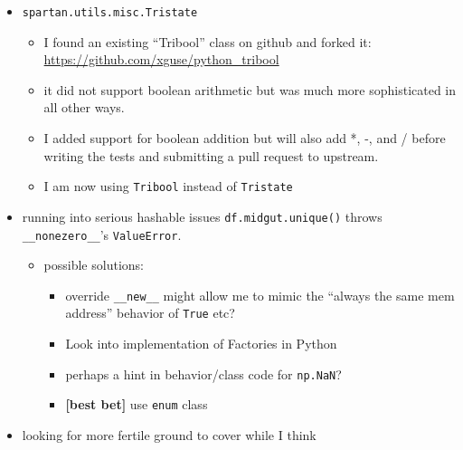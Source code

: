 \documentclass[letterpaper]{scrartcl}
\begin{document}
\begin{itemize}
\itemsep1pt\parskip0pt
\item
  \texttt{spartan.utils.misc.Tristate}

  \begin{itemize}
  \itemsep1pt\parskip0pt
  \item
    I found an existing ``Tribool'' class on github and forked
    it:\\\url{https://github.com/xguse/python_tribool}
  \item
    it did not support boolean arithmetic but was much more
    sophisticated in all other ways.
  \item
    I added support for boolean addition but will also add *, -, and /
    before writing the tests and submitting a pull request to upstream.
  \item
    I am now using \texttt{Tribool} instead of \texttt{Tristate}
  \end{itemize}
\item
  running into serious hashable issues \texttt{df.midgut.unique()}
  throws \texttt{\_\_nonezero\_\_}'s \texttt{ValueError}.

  \begin{itemize}
  \itemsep1pt\parskip0pt
  \item
    possible solutions:

    \begin{itemize}
    \itemsep1pt\parskip0pt
    \item
      override \texttt{\_\_new\_\_} might allow me to mimic the ``always
      the same mem address'' behavior of \texttt{True} etc?
    \item
      Look into implementation of Factories in Python
    \item
      perhaps a hint in behavior/class code for \texttt{np.NaN}?
    \item
      \textbf{{[}best bet{]}} use \texttt{enum} class
    \end{itemize}
  \end{itemize}
\item
  looking for more fertile ground to cover while I think
\end{itemize}
\end{document}
